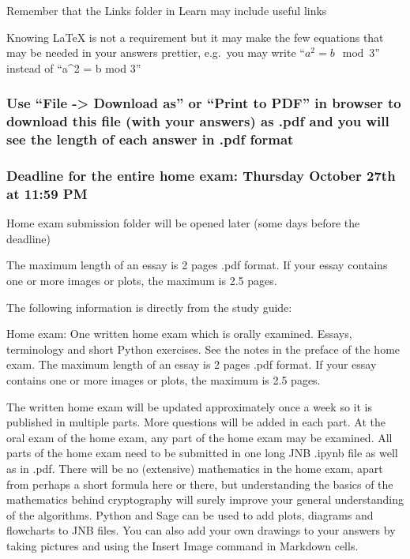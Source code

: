 \documentclass[11pt]{article}
\begin{document}
Remember that the Links folder in Learn may include useful links

Knowing LaTeX is not a requirement but it may make the few equations
that may be needed in your answers prettier, e.g.~you may write
``\(a^2 = b \mod 3\)'' instead of ``a\^{}2 = b mod 3''

\hypertarget{use-file---download-as-or-print-to-pdf-in-browser-to-download-this-file-with-your-answers-as-.pdf-and-you-will-see-the-length-of-each-answer-in-.pdf-format}{%
\subsubsection{Use ``File -\textgreater{} Download as'' or ``Print to
PDF'' in browser to download this file (with your answers) as .pdf and
you will see the length of each answer in .pdf
format}\label{use-file---download-as-or-print-to-pdf-in-browser-to-download-this-file-with-your-answers-as-.pdf-and-you-will-see-the-length-of-each-answer-in-.pdf-format}}

\hypertarget{deadline-for-the-entire-home-exam-thursday-october-27th-at-1159-pm}{%
\subsubsection{Deadline for the entire home exam: Thursday October 27th
at 11:59
PM}\label{deadline-for-the-entire-home-exam-thursday-october-27th-at-1159-pm}}

Home exam submission folder will be opened later (some days before the
deadline)

The maximum length of an essay is 2 pages .pdf format. If your essay
contains one or more images or plots, the maximum is 2.5 pages.

    The following information is directly from the study guide:

Home exam: One written home exam which is orally examined. Essays,
terminology and short Python exercises. See the notes in the preface of
the home exam. The maximum length of an essay is 2 pages .pdf format. If
your essay contains one or more images or plots, the maximum is 2.5
pages.

The written home exam will be updated approximately once a week so it is
published in multiple parts. More questions will be added in each part.
At the oral exam of the home exam, any part of the home exam may be
examined. All parts of the home exam need to be submitted in one long
JNB .ipynb file as well as in .pdf. There will be no (extensive)
mathematics in the home exam, apart from perhaps a short formula here or
there, but understanding the basics of the mathematics behind
cryptography will surely improve your general understanding of the
algorithms. Python and Sage can be used to add plots, diagrams and
flowcharts to JNB files. You can also add your own drawings to your
answers by taking pictures and using the Insert Image command in
Markdown cells.
\end{document}
